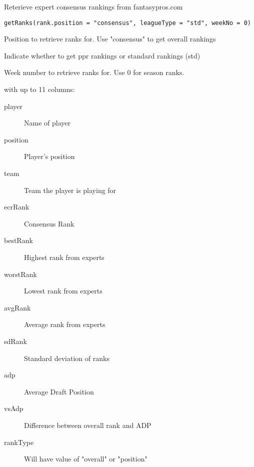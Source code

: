 \documentclass[a4paper]{book}
\begin{document}
%
\begin{Description}\relax
Reterieve expert consensus rankings from fantasypros.com
\end{Description}
%
\begin{Usage}
\begin{verbatim}
getRanks(rank.position = "consensus", leagueType = "std", weekNo = 0)
\end{verbatim}
\end{Usage}
%
\begin{Arguments}
\begin{ldescription}
\item[\code{rank.position}] Position to retrieve ranks for. Use "consensus" to get
overall rankings

\item[\code{leagueType}] Indicate whether to get ppr rankings or standard rankings (std)

\item[\code{weekNo}] Week number to retrieve ranks for. Use 0 for season ranks.
\end{ldescription}
\end{Arguments}
%
\begin{Value}
 with up to 11 columns:
\begin{description}

\item[player] Name of player
\item[position] Player's position
\item[team] Team the player is playing for
\item[ecrRank] Consensus Rank
\item[bestRank] Highest rank from experts
\item[worstRank] Lowest rank from experts
\item[avgRank] Average rank from experts
\item[sdRank] Standard deviation of ranks
\item[adp] Average Draft Position
\item[vsAdp] Difference between overall rank and ADP
\item[rankType] Will have value of "overall" or "position"

\end{description}

\end{Value}
\end{document}

